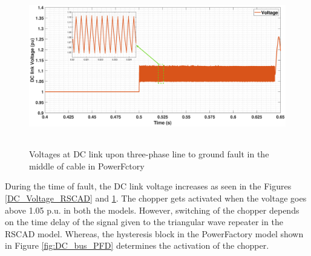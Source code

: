 \begin{figure}[H]
    \includegraphics[height = 7cm,width = \textwidth]{Diagrams/Appendix_B/DC_Voltage_PFD.eps}
    \caption{Voltages at DC link upon three-phase line to ground fault in the middle of cable in PowerFctory}
    \label{DC_Voltage_PFD}
\end{figure}

During the time of fault, the \gls{DC} link voltage increases as seen in the Figures \ref{DC_Voltage_RSCAD} and \ref{DC_Voltage_PFD}. The chopper gets activated when the voltage goes above 1.05 p.u. in both the models. However, switching of the chopper depends on the time delay of the signal given to the triangular wave repeater in the RSCAD model. Whereas, the hysteresis block in the PowerFactory model shown in Figure \ref{fig:DC_bus_PFD} determines the activation of the chopper. 
